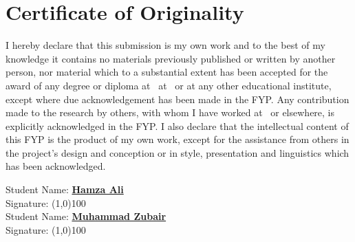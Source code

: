 \chapter*{Certificate of Originality}
I hereby declare that this submission is my own work and to the best of my knowledge it contains no materials previously published or written by another person, nor material which to a substantial extent has been accepted for the award of any degree or diploma at \fypsupervisoraffiliation\ at \fypdept\ or at any other educational institute, except where due acknowledgement has been made in the FYP. Any contribution made to the research by others, with whom I have worked at \fypdept\ or elsewhere, is explicitly acknowledged in the FYP. I also declare that the intellectual content of this FYP is the product of my own work, except for the assistance from others in the project's design and conception or in style, presentation and linguistics which has been acknowledged.
\vspace*{10pt}\noindent
\begin{flushright}
Student Name: \textbf{\underline{Hamza Ali}}\\
\vspace*{10pt}\noindent
Signature: \line(1,0){100}\\
\vspace*{14pt}\noindent
Student Name: \textbf{\underline{Muhammad Zubair}}\\
\vspace*{10pt}\noindent
Signature: \line(1,0){100}
\end{flushright}
